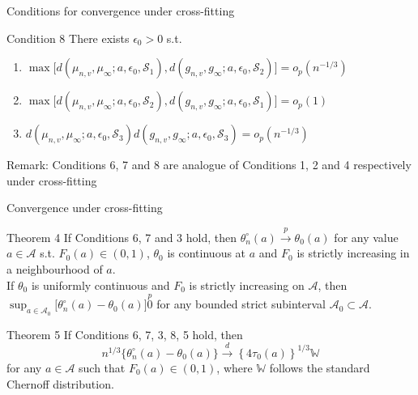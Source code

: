 \documentclass{beamer}
\newcommand{\vs}[1]{\vspace{#1 cm}}
\begin{document}
\begin{frame}{Conditions for convergence under cross-fitting}
  \begin{block}{Condition 8}
    There exists $\epsilon_0 > 0$ s.t.
    \begin{enumerate}
      \item $\max \big[ d(\mu_{n,v},\mu_\infty; a,\epsilon_0,\mathcal{S}_1), d(g_{n,v},g_\infty; a,\epsilon_0,\mathcal{S}_2) \big] = o_p(n^{-1/3})$
      \item $\max \big[ d(\mu_{n,v},\mu_\infty; a,\epsilon_0,\mathcal{S}_2), d(g_{n,v},g_\infty; a,\epsilon_0,\mathcal{S}_1) \big] = o_p(1)$
      \item $d(\mu_{n,v},\mu_\infty; a,\epsilon_0,\mathcal{S}_3) d(g_{n,v},g_\infty; a,\epsilon_0,\mathcal{S}_3) = o_p(n^{-1/3})$
    \end{enumerate}
  \end{block}
  Remark: Conditions 6, 7 and 8 are analogue of Conditions 1, 2 and 4 respectively under cross-fitting
\end{frame}

\begin{frame}{Convergence under cross-fitting}
  \begin{block}{Theorem 4}
    If Conditions 6, 7 and 3 hold, then $\theta_n^\circ(a) \stackrel{p}{\rightarrow} \theta_0(a)$ for any value $a \in \mathcal{A}$ s.t. $F_0(a) \in (0,1)$, $\theta_0$ is continuous at $a$ and $F_0$ is strictly increasing in a neighbourhood of $a$. \\
    \vs{0.3}
    If $\theta_0$ is uniformly continuous and $F_0$ is strictly increasing on $\mathcal{A}$, then $\sup_{a \in \mathcal{A}_0} \big[ \theta_n^\circ(a) -\theta_0(a) \big] \stackrel{p} 0$ for any bounded strict subinterval $\mathcal{A}_0 \subset \mathcal{A}$.
  \end{block}
  \begin{block}{Theorem 5}
    If Conditions 6, 7, 3, 8, 5 hold, then
    $$
      n^{1/3} \{ \theta_n^\circ(a) -\theta_0(a) \} \stackrel{d}{\rightarrow} \left\{ 4 \tau_0(a) \right\}^{1/3} \mathbb{W}
    $$
    for any $a \in \mathcal{A}$ such that $F_0(a) \in (0,1)$, where $\mathbb{W}$ follows the standard Chernoff distribution.
  \end{block}
\end{frame}
\end{document}
